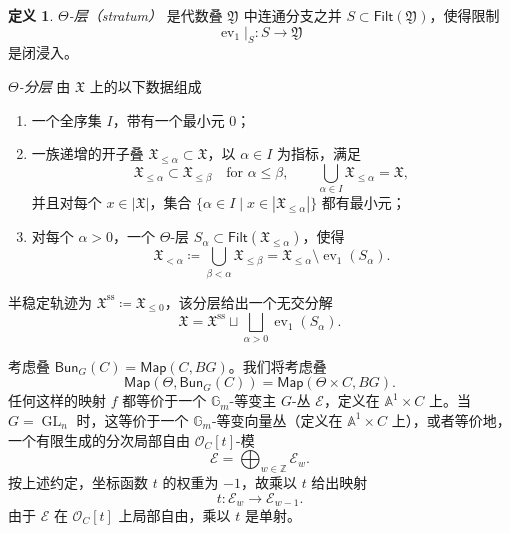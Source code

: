\documentclass{amsart}
\theoremstyle{definition}
\newtheorem{defn}[thm]{定义}
\theoremstyle{remark}
\theoremstyle{plain}
\theoremstyle{definition}
\theoremstyle{remark}
\newcommand{\A}{\mathbb{A}}
\newcommand{\G}{\mathbb{G}}
\newcommand{\Z}{\mathbb{Z}}
\newcommand{\mc}[1]{\mathcal{#1}}
\newcommand{\mf}[1]{\mathfrak{#1}}
\newcommand{\mr}[1]{\mathrm{#1}}
\newcommand{\on}[1]{\operatorname{#1}}
\newcommand{\ms}[1]{\mathsf{#1}}
\newcommand{\1}{\mathbf{1}}
\newcommand{\2}{\mathbf{2}}
\newcommand{\3}{\mathbf{3}}
\DeclareMathOperator{\ev}{ev}
\begin{document}
\begin{defn}
    \textit{\(\Theta\)-层（stratum）} 是代数叠 \(\mf{Y}\) 中连通分支之并 \(S\subset\ms{Filt}(\mf{Y})\)，使得限制
    \[
        \ev_1|_S\colon S\longrightarrow\mf{Y}
    \]
    是闭浸入。

    \textit{\(\Theta\)-分层} 由 \(\mf{X}\) 上的以下数据组成
    \begin{enumerate}
        \item 一个全序集 \(I\)，带有一个最小元 \(0\)；
        \item 一族递增的开子叠 \(\mf{X}_{\leq\alpha}\subset\mf{X}\)，以 \(\alpha\in I\) 为指标，满足
        \[
            \mf{X}_{\leq\alpha}\subset\mf{X}_{\leq\beta}
            \quad\text{for }\alpha\leq\beta,
            \qquad
            \bigcup_{\alpha\in I}\mf{X}_{\leq\alpha}=\mf{X},
        \]
        并且对每个 \(x\in|\mf{X}|\)，集合 \(\{\alpha\in I\mid x\in|\mf{X}_{\leq\alpha}|\}\) 都有最小元；
        \item 对每个 \(\alpha>0\)，一个 \(\Theta\)-层 \(S_\alpha\subset\ms{Filt}(\mf{X}_{\leq\alpha})\)，使得
        \[
            \mf{X}_{<\alpha}
            \coloneqq
            \bigcup_{\beta<\alpha}\mf{X}_{\leq\beta}
            =
            \mf{X}_{\leq\alpha}\setminus\ev_1(S_\alpha).
        \]
    \end{enumerate}
    半稳定轨迹为 \(\mf{X}^{\mr{ss}}\coloneqq\mf{X}_{\leq0}\)，该分层给出一个无交分解
    \[
        \mf{X}
        =
        \mf{X}^{\mr{ss}}
        \sqcup
        \bigsqcup_{\alpha>0}\ev_1(S_\alpha).
    \]
\end{defn}

考虑叠 \(\ms{Bun}_G(C) = \ms{Map}(C, BG)\)。我们将考虑叠
\[ \ms{Map}(\Theta, \ms{Bun}_G(C)) = \ms{Map}(\Theta \times C, BG). \]
任何这样的映射 \(f\) 都等价于一个 \(\G_m\)-等变主 \(G\)-丛 \(\mc{E}\)，定义在 \(\A^1\times C\) 上。当 \(G=\on{GL}_n\) 时，这等价于一个 \(\G_m\)-等变向量丛（定义在 \(\A^1\times C\) 上），或者等价地，一个有限生成的分次局部自由 \(\mc{O}_C[t]\)-模
\[
    \mc{E}=\bigoplus_{w\in\Z}\mc{E}_w.
\]
按上述约定，坐标函数 \(t\) 的权重为 \(-1\)，故乘以 \(t\) 给出映射
\[
    t\colon\mc{E}_w\longrightarrow\mc{E}_{w-1}.
\]
由于 \(\mc{E}\) 在 \(\mc{O}_C[t]\) 上局部自由，乘以 \(t\) 是单射。
\end{document}
